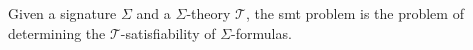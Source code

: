 

\begin{definition}
  Given a signature $\Sigma{}$ and a $\Sigma{}$-theory $\mathcal{T}$, the
  \gls{smt} problem is the problem of determining the
  $\mathcal{T}$-satisfiability of $\Sigma{}$-formulas.
\end{definition}







